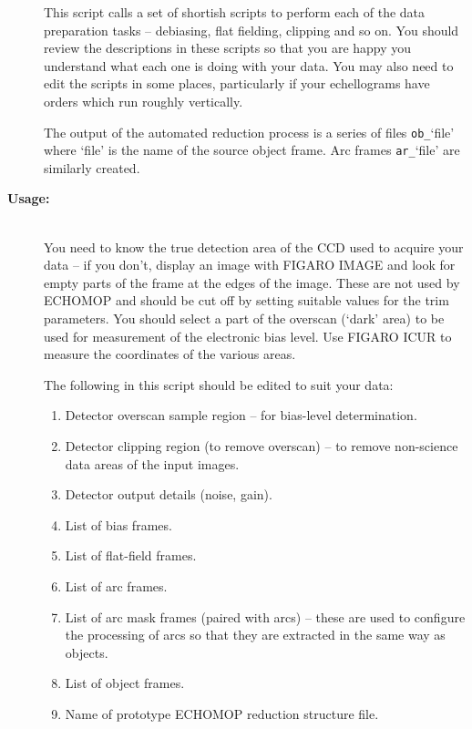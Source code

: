 \documentclass[twoside,11pt]{article}
\newcommand{\xref}[3]{#1}
\renewcommand{\_}{\texttt{\symbol{95}}}
\newcommand{\scspec}[2]{#1}
\newcommand{\scspec}[2]{#2}
\begin{document}
\begin{description}
     This script calls a set of shortish scripts to perform each of the
     data preparation tasks \scspec{--}{-} debiasing, flat fielding,
     clipping and so on.
     You should review the descriptions in these scripts so that you are
     happy you understand what each one is doing with your data.  You may
     also need to edit the scripts in some places, particularly if your
     echellograms have orders which run roughly vertically.

     The output of the automated reduction process is a series of
     files \verb+ob_+`file' where `file' is the name of the source object
     frame.
     Arc frames \verb+ar_+`file' are similarly created.

\item [{\bf Usage:}] \mbox{} \\
     You need to know the true detection area of the CCD used to acquire
     your data \scspec{--}{-} if you don't, display an image with
     \xref{FIGARO}{sun86}{} \xref{IMAGE}{sun86}{IMAGE} and
     look for empty parts of the frame at the edges of the image.
     These are not used by ECHOMOP and should be cut off by setting
     suitable values for the trim parameters.  You should select a part
     of the overscan (`dark' area) to be used for measurement of the
     electronic bias level.
     Use FIGARO \xref{ICUR}{sun86}{ICUR} to measure the coordinates of the
     various areas.

     The following in this script should be edited to suit your data:

\begin{enumerate}

\item Detector overscan sample region \scspec{--}{-} for bias-level
      determination.
\item Detector clipping region (to remove overscan) \scspec{--}{-} to remove
      non-science data areas of the input images.
\item Detector output details (noise, gain).
\item List of bias frames.
\item List of flat-field frames.
\item List of arc frames.
\item List of arc mask frames (paired with arcs) \scspec{--}{-} these are
      used to configure the processing of arcs so that they are extracted
      in the same way as objects.
\item List of object frames.
\item Name of prototype ECHOMOP reduction structure file.


\end{enumerate}
\end{description}
\end{document}
